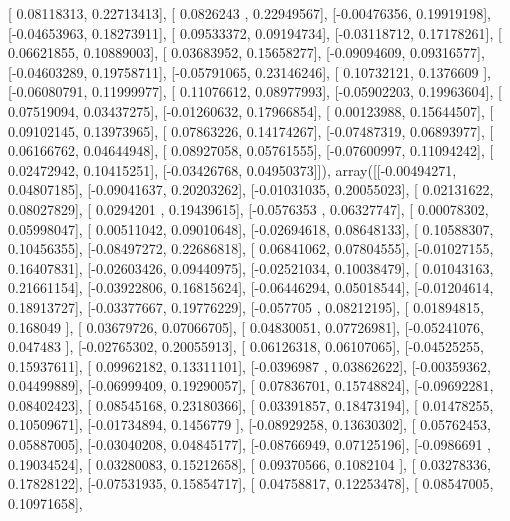 \documentclass{article}
\begin{document}
       [ 0.08118313,  0.22713413],
       [ 0.0826243 ,  0.22949567],
       [-0.00476356,  0.19919198],
       [-0.04653963,  0.18273911],
       [ 0.09533372,  0.09194734],
       [-0.03118712,  0.17178261],
       [ 0.06621855,  0.10889003],
       [ 0.03683952,  0.15658277],
       [-0.09094609,  0.09316577],
       [-0.04603289,  0.19758711],
       [-0.05791065,  0.23146246],
       [ 0.10732121,  0.1376609 ],
       [-0.06080791,  0.11999977],
       [ 0.11076612,  0.08977993],
       [-0.05902203,  0.19963604],
       [ 0.07519094,  0.03437275],
       [-0.01260632,  0.17966854],
       [ 0.00123988,  0.15644507],
       [ 0.09102145,  0.13973965],
       [ 0.07863226,  0.14174267],
       [-0.07487319,  0.06893977],
       [ 0.06166762,  0.04644948],
       [ 0.08927058,  0.05761555],
       [-0.07600997,  0.11094242],
       [ 0.02472942,  0.10415251],
       [-0.03426768,  0.04950373]]), array([[-0.00494271,  0.04807185],
       [-0.09041637,  0.20203262],
       [-0.01031035,  0.20055023],
       [ 0.02131622,  0.08027829],
       [ 0.0294201 ,  0.19439615],
       [-0.0576353 ,  0.06327747],
       [ 0.00078302,  0.05998047],
       [ 0.00511042,  0.09010648],
       [-0.02694618,  0.08648133],
       [ 0.10588307,  0.10456355],
       [-0.08497272,  0.22686818],
       [ 0.06841062,  0.07804555],
       [-0.01027155,  0.16407831],
       [-0.02603426,  0.09440975],
       [-0.02521034,  0.10038479],
       [ 0.01043163,  0.21661154],
       [-0.03922806,  0.16815624],
       [-0.06446294,  0.05018544],
       [-0.01204614,  0.18913727],
       [-0.03377667,  0.19776229],
       [-0.057705  ,  0.08212195],
       [ 0.01894815,  0.168049  ],
       [ 0.03679726,  0.07066705],
       [ 0.04830051,  0.07726981],
       [-0.05241076,  0.047483  ],
       [-0.02765302,  0.20055913],
       [ 0.06126318,  0.06107065],
       [-0.04525255,  0.15937611],
       [ 0.09962182,  0.13311101],
       [-0.0396987 ,  0.03862622],
       [-0.00359362,  0.04499889],
       [-0.06999409,  0.19290057],
       [ 0.07836701,  0.15748824],
       [-0.09692281,  0.08402423],
       [ 0.08545168,  0.23180366],
       [ 0.03391857,  0.18473194],
       [ 0.01478255,  0.10509671],
       [-0.01734894,  0.1456779 ],
       [-0.08929258,  0.13630302],
       [ 0.05762453,  0.05887005],
       [-0.03040208,  0.04845177],
       [-0.08766949,  0.07125196],
       [-0.0986691 ,  0.19034524],
       [ 0.03280083,  0.15212658],
       [ 0.09370566,  0.1082104 ],
       [ 0.03278336,  0.17828122],
       [-0.07531935,  0.15854717],
       [ 0.04758817,  0.12253478],
       [ 0.08547005,  0.10971658],
\end{document}
